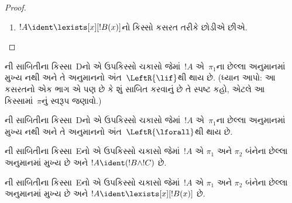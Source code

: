\begin{proof}
\begin{enumerate}
સાબિતી~$\pi_1'$નો અંતિમ સિક્વન્ટ
$\Gamma \Sequent \Delta, !B(c)$ છે,
જ્યાં~$c$ એ~$\RightR{\lforall}$
અનુમાનનો સ્વચલ છે.
તેથી~$c$ એ~$!B(x)$, $\Gamma$
કે~$\Delta$માં આવતો નથી.
સાબિતી~$\pi$ નિયમિત છે એમ ધારીએ,
એટલે~$c$ માત્ર ત્યાર પછી આવતા
$\RightR{\lforall}$ અનુમાનનો જ સ્વચલ છે
અને તેની ઉપર જ આવે છે;
અર્થાત્, તે માત્ર~$\pi_1'$માં આવે છે
અને~$\pi_1'$ની અંદરના કોઈ અનુમાનનો
સ્વચલ નથી. કારણ કે~$c$ એ~$\pi_2$માં
આવતો નથી, તે~$t$માં પણ આવતો નથી.
 મુજબ
સાબિતી~$\Subst{\pi_1'}{t}{c}$ એ
$\Gamma \Sequent \Delta, !B(t)$ની
સાબિતી છે. હવે નીચેની
સાબિતી પર આગમન-પૂર્વધારણા લગાવીએ:
\[
\AxiomC{}
\RightLabel{$\Subst{\pi_1'}{t}{c}$}
\Deduce$\Gamma \fCenter \Delta, !B(t)$
\AxiomC{}
\RightLabel{$\pi_2''$}
\Deduce$!B(t), \Gamma \fCenter \Delta$
\RightLabel{\CutCS}
\BinaryInf$\Gamma \fCenter \Delta$
\DisplayProof
\]
(આગમન-પૂર્વધારણા લાગુ પડે છે,
કારણ કે કટ સૂત્ર~$!B(t)$ છે;
એટલે આ સાબિતીનો કટ-ક્રમ~$\pi$
કરતાં ઓછો છે.)
\item $!A \ident \lexists[x][!B(x)]$નો
કિસ્સો કસરત તરીકે છોડીએ છીએ.
\end{enumerate}
\end{proof}

\begin{prob}
ની સાબિતીના કિસ્સા~Dનો
એ ઉપકિસ્સો ચકાસો જેમાં~$!A$ એ~$\pi_1$ના
છેલ્લા અનુમાનમાં મુખ્ય નથી અને તે અનુમાનનો
અંત~$\LeftR{\lif}$થી થાય છે.
(ધ્યાન આપો: આ કસરતનો એક ભાગ એ પણ છે કે
શું સાબિત કરવાનું છે તે સ્પષ્ટ કહો,
એટલે આ કિસ્સામાં~$\pi$નું સ્વરૂપ જણાવો.)
\end{prob}

\begin{prob}
ની સાબિતીના કિસ્સા~Dનો
એ ઉપકિસ્સો ચકાસો જેમાં~$!A$ એ~$\pi_1$ના
છેલ્લા અનુમાનમાં મુખ્ય નથી અને તે અનુમાનનો
અંત~$\LeftR{\lforall}$થી થાય છે.
\end{prob}

\begin{prob}
ની સાબિતીના કિસ્સા~Eનો
એ ઉપકિસ્સો ચકાસો જેમાં~$!A$ એ
$\pi_1$ અને $\pi_2$ બંનેના
છેલ્લા અનુમાનમાં મુખ્ય છે અને
$!A \ident (!B \land !C)$ છે.
\end{prob}

\begin{prob}
ની સાબિતીના કિસ્સા~Eનો
એ ઉપકિસ્સો ચકાસો જેમાં~$!A$ એ
$\pi_1$ અને $\pi_2$ બંનેના
છેલ્લા અનુમાનમાં મુખ્ય છે અને
$!A \ident \lexists[x][!B(x)]$ છે.
\end{prob}


